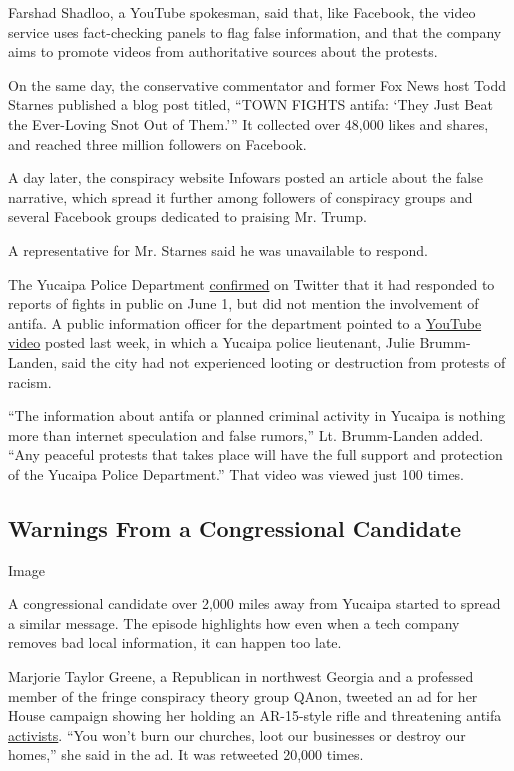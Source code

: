 Farshad Shadloo, a YouTube spokesman, said that, like Facebook, the
video service uses fact-checking panels to flag false information, and
that the company aims to promote videos from authoritative sources about
the protests.

On the same day, the conservative commentator and former Fox News host
Todd Starnes published a blog post titled, ``TOWN FIGHTS antifa: `They
Just Beat the Ever-Loving Snot Out of Them.''' It collected over 48,000
likes and shares, and reached three million followers on Facebook.

A day later, the conspiracy website Infowars posted an article about the
false narrative, which spread it further among followers of conspiracy
groups and several Facebook groups dedicated to praising Mr. Trump.

A representative for Mr. Starnes said he was unavailable to respond.

The Yucaipa Police Department
\href{https://twitter.com/YucaipaPD/status/1267979797059133440}{confirmed}
on Twitter that it had responded to reports of fights in public on June
1, but did not mention the involvement of antifa. A public information
officer for the department pointed to a
\href{https://www.youtube.com/watch?v=KeSiWIbNXEY\&feature=youtu.be}{YouTube
video} posted last week, in which a Yucaipa police lieutenant, Julie
Brumm-Landen, said the city had not experienced looting or destruction
from protests of racism.

``The information about antifa or planned criminal activity in Yucaipa
is nothing more than internet speculation and false rumors,'' Lt.
Brumm-Landen added. ``Any peaceful protests that takes place will have
the full support and protection of the Yucaipa Police Department.'' That
video was viewed just 100 times.

\hypertarget{warnings-from-a-congressional-candidate}{%
\subsection{Warnings From a Congressional
Candidate}\label{warnings-from-a-congressional-candidate}}

Image

A congressional candidate over 2,000 miles away from Yucaipa started to
spread a similar message. The episode highlights how even when a tech
company removes bad local information, it can happen too late.

Marjorie Taylor Greene, a Republican in northwest Georgia and a
professed member of the fringe conspiracy theory group QAnon, tweeted an
ad for her House campaign showing her holding an AR-15-style rifle and
threatening antifa
\href{https://www.nytimes3xbfgragh.onion/2020/06/11/us/antifa-protests-george-floyd.html}{activists}.
``You won't burn our churches, loot our businesses or destroy our
homes,'' she said in the ad. It was retweeted 20,000 times.


